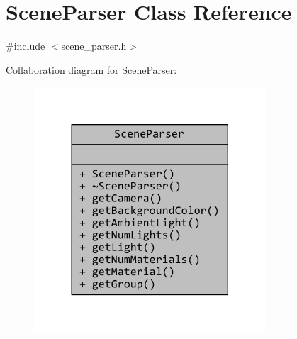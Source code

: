 \hypertarget{classSceneParser}{\section{Scene\+Parser Class Reference}
\label{classSceneParser}
}


{\ttfamily \#include $<$scene\+\_\+parser.\+h$>$}



Collaboration diagram for Scene\+Parser\+:
\nopagebreak
\begin{figure}[H]
\begin{center}
\leavevmode
\includegraphics[width=245pt]{classSceneParser__coll__graph}
\end{center}
\end{figure}
